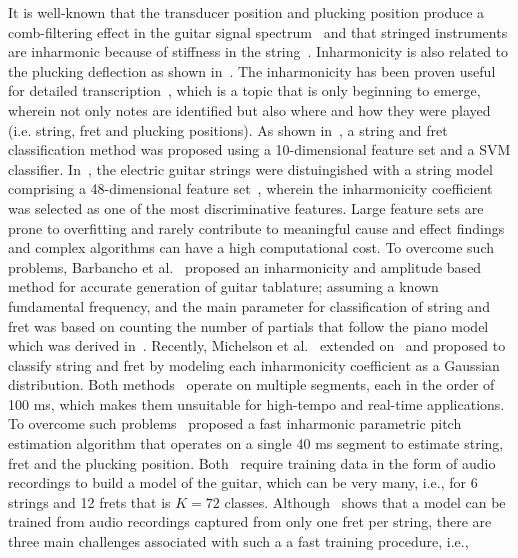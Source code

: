 \documentclass{article}
\begin{document}
\begin{sloppy}
It is well-known that the transducer position and plucking position produce a comb-filtering effect in the guitar signal spectrum~\cite{fletcher:physics_of_musical_instruments} and that stringed instruments are inharmonic because of stiffness in the string~\cite{fletcher:principles_of_vibration_and_sound}. Inharmonicity is also related to the plucking deflection as shown in~\cite{donkin:acoustics,rayleigh:sound,coltShank,rossing:science_of_string_instruments}. The inharmonicity has been proven useful for detailed transcription~\cite{barbancho:inharmonicity_tablature}, which is a topic that is only beginning to emerge, wherein not only notes are identified but also where and how they were played (i.e. string, fret and plucking positions). As shown in~\cite{dittmar:realtime_string_detection}, a string and fret classification method was proposed using a 10-dimensional feature set and a SVM classifier. In~\cite{abesser:automatic_string_detection_ml}, the electric guitar strings were distuingished with a string model comprising a 48-dimensional feature set~\cite{abesser:automatic_string_detection_ml}, wherein the inharmonicity coefficient was selected as one of the most discriminative features. Large feature sets are prone to overfitting and rarely contribute to meaningful cause and effect findings and complex algorithms can have a high computational cost. 
To overcome such problems, Barbancho et al.~\cite{barbancho:inharmonicity_tablature} proposed an inharmonicity and amplitude based method for accurate generation of guitar tablature; assuming a known fundamental frequency, and the main parameter for classification of string and fret was based on counting the number of partials that follow the piano model which was derived in~\cite{fletcher:piano_model}. Recently, Michelson et al.~\cite{michelson2018_aes} extended on~\cite{barbancho:inharmonicity_tablature} and proposed to classify string and fret by modeling each inharmonicity coefficient as a Gaussian distribution. Both methods~\cite{barbancho:inharmonicity_tablature,michelson2018_aes} operate on multiple segments, each in the order of 100 ms, which makes them unsuitable for high-tempo and real-time applications. To overcome such problems~\cite{hjerrild::icassp19} proposed a fast inharmonic parametric pitch estimation algorithm that operates on a single 40 ms segment to estimate string, fret and the plucking position. Both~\cite{barbancho:inharmonicity_tablature,michelson2018_aes,hjerrild::icassp19} require training data in the form of audio recordings to build a model of the guitar, which can be very many, i.e., for 6 strings and 12 frets that is $K=72$  classes. Although~\cite{hjerrild::icassp19,barbancho:inharmonicity_tablature} shows that a model can be trained from audio recordings captured from only one fret per string, there are three main challenges associated with such a a fast training procedure, i.e.,

\end{sloppy}
\end{document}
